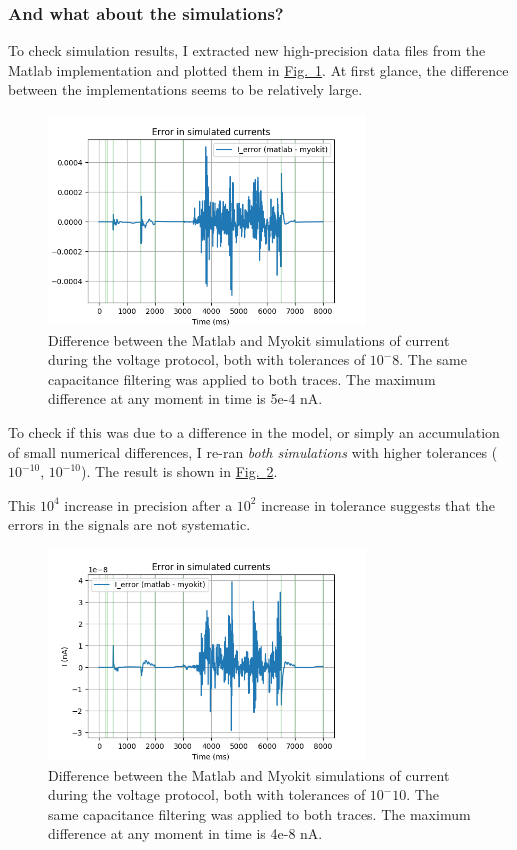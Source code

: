 \documentclass[preprint,authoryear,10pt]{elsarticle}
\newcommand\fig[2][]{\hyperref[fig:#2]{Fig.~\ref*{fig:#2}\ifstrempty{#1}{}{.#1}}}
\begin{document}
\subsubsection{And what about the simulations?}

To check simulation results, I extracted new high-precision data files from the
 Matlab implementation and plotted them in \fig{sine-wave-current-error-tol8}.
At first glance, the difference between the implementations seems to be
 relatively large.

\begin{figure}[H]
\centerline{
\includegraphics[width=0.75\textwidth]{fig/sine-wave-current-error-tol8}
}
\caption{%
Difference between the Matlab and Myokit simulations of current during the
 voltage protocol, both with tolerances of $10^-8$.
The same capacitance filtering was applied to both traces.
The maximum difference at any moment in time is 5e-4 nA.
}
\label{fig:sine-wave-current-error-tol8}
\end{figure}

To check if this was due to a difference in the model, or simply an
 accumulation of small numerical differences, I re-ran \emph{both simulations}
 with higher tolerances ($10^{-10}$, $10^{-10}$).
The result is shown in \fig{sine-wave-current-error-tol10}.

This $10^4$ increase in precision after a $10^2$ increase in tolerance suggests
 that the errors in the signals are not systematic.

\begin{figure}[H]
\centerline{
\includegraphics[width=0.75\textwidth]{fig/sine-wave-current-error-tol10}
}
\caption{%
Difference between the Matlab and Myokit simulations of current during the
 voltage protocol, both with tolerances of $10^-10$.
The same capacitance filtering was applied to both traces.
The maximum difference at any moment in time is 4e-8 nA.
}
\label{fig:sine-wave-current-error-tol10}
\end{figure}
\end{document}
